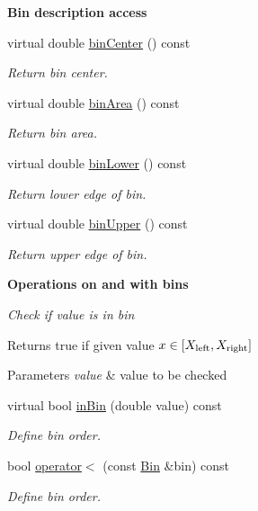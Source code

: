 \begin{Indent}{\bf Bin description access}\par
\begin{DoxyCompactItemize}
\item 
virtual double \hyperlink{classSlidingWindow_1_1Bin_a341340989bfd98e0e5b8c77501fb87f6}{bin\+Center} () const 
\begin{DoxyCompactList}\small\item\em Return bin center. \end{DoxyCompactList}\item 
virtual double \hyperlink{classSlidingWindow_1_1Bin_ab54bc0cf4a1e5224c3d57d7b32e21420}{bin\+Area} () const 
\begin{DoxyCompactList}\small\item\em Return bin area. \end{DoxyCompactList}\item 
virtual double \hyperlink{classSlidingWindow_1_1Bin_ad6af68e450a7be9404a0b8e7b47fc52f}{bin\+Lower} () const 
\begin{DoxyCompactList}\small\item\em Return lower edge of bin. \end{DoxyCompactList}\item 
virtual double \hyperlink{classSlidingWindow_1_1Bin_a86f9d616c1f7673cd41be174779c836c}{bin\+Upper} () const 
\begin{DoxyCompactList}\small\item\em Return upper edge of bin. \end{DoxyCompactList}\end{DoxyCompactItemize}
\end{Indent}
\begin{Indent}{\bf Operations on and with bins}\par
{\em Check if value is in bin

\begin{DoxyReturn}{Returns}
{\ttfamily true} if given value $ x \in [X_{\rm left},X_{\rm right}] $
\end{DoxyReturn}

\begin{DoxyParams}{Parameters}
{\em value} & value to be checked \\
\hline
\end{DoxyParams}
}\begin{DoxyCompactItemize}
\item 
virtual bool \hyperlink{classSlidingWindow_1_1Bin_a238ef3032c3d5f3e8a0502c1a3d15619}{in\+Bin} (double value) const 
\begin{DoxyCompactList}\small\item\em Define bin order. \end{DoxyCompactList}\item 
bool \hyperlink{classSlidingWindow_1_1Bin_a1fb3205c96d69bd836414372fdd56c9b}{operator$<$} (const \hyperlink{classSlidingWindow_1_1Bin}{Bin} \&bin) const 
\begin{DoxyCompactList}\small\item\em Define bin order. \end{DoxyCompactList}\end{DoxyCompactItemize}
\end{Indent}
